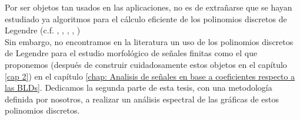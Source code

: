 Por ser objetos tan usados en las aplicaciones, no es de
extrañarse que se hayan estudiado ya
algoritmos para el cálculo eficiente
de los polinomios discretos de Legendre
(c.f. \cite{Neuman}, \cite{abur}, \cite{abur2}, \cite{dris}, \cite{mukun}) \\


Sin embargo,
no encontramos en la literatura
un uso de los polinomios discretos
de Legendre para el estudio morfológico de señales finitas
como el que proponemos (después de construir cuidadosamente
estos objetos en el capítulo \ref{cap 2})
en el capítulo 
\ref{chap: Analisis de señales en base a coeficientes respecto a las BLDs}.
Dedicamos la segunda parte de esta tesis, con una metodología 
definida por nosotros, a realizar un análisis espectral de las gráficas
de estos polinomios discretos.
